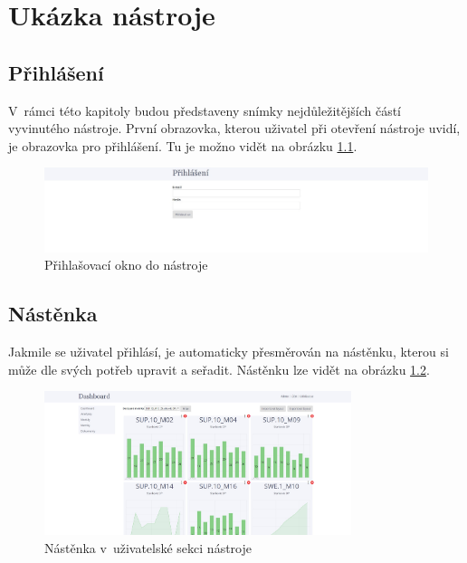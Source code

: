 \documentclass[czech,master]{diploma}
\begin{document}
\chapter{Ukázka nástroje}

\section{Přihlášení}
V~rámci této kapitoly budou představeny snímky nejdůležitějších částí vyvinutého nástroje. První obrazovka, kterou uživatel při otevření nástroje uvidí, je obrazovka pro přihlášení. Tu je možno vidět na obrázku \ref{fig:metrics_tool_login}.

\begin{figure}[!ht]
    \centering
    \includegraphics[width=1\textwidth]{Diplomka/Figures/metrics_tool/login.jpg}
    \caption{Přihlašovací okno do nástroje}
    \label{fig:metrics_tool_login}
\end{figure}

\newpage
\section{Nástěnka}

Jakmile se uživatel přihlásí, je automaticky přesměrován na nástěnku, kterou si může dle svých potřeb upravit a seřadit. Nástěnku lze vidět na obrázku \ref{fig:metrics_tool_dashboard}.

\begin{figure}[!ht]
    \centering
    \includegraphics[width=0.8\textwidth]{Diplomka/Figures/metrics_tool/dashboard.jpg}
    \caption{Nástěnka v~uživatelské sekci nástroje}
    \label{fig:metrics_tool_dashboard}
\end{figure}
\end{document}
